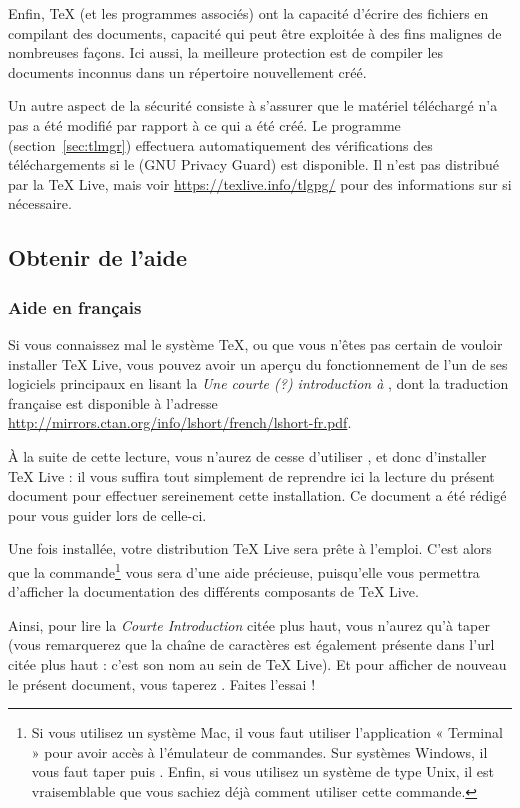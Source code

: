\documentclass[german, english, french]{article}
\renewcommand{\TL}{\TeX{} Live\xspace}%
\begin{document}
Enfin, \TeX{} (et les programmes associés) ont la capacité d'écrire des fichiers
en compilant des documents, capacité qui peut être exploitée à des fins malignes
de nombreuses façons. Ici aussi, la meilleure protection est de compiler les
documents inconnus dans un répertoire nouvellement créé.

Un autre aspect de la sécurité consiste à s'assurer que le matériel téléchargé
n'a pas a été modifié par rapport à ce qui a été créé. Le programme 
(section~\ref{sec:tlmgr}) effectuera automatiquement des vérifications des
téléchargements si le  (GNU Privacy Guard) est disponible. Il n'est
pas distribué par la \TL, mais voir \url{https://texlive.info/tlgpg/} pour des
informations sur  si nécessaire.

\subsection{Obtenir de l'aide}
\label{sec:help}
\subsubsection{Aide en français}
Si vous connaissez mal le système \TeX{}, ou que vous n'êtes pas certain de
vouloir installer \TL{}, vous pouvez avoir un aperçu du fonctionnement de l'un
de ses logiciels principaux en lisant la \emph{Une courte (\string?)
  introduction à \LaTeXe{}}, dont la traduction française est disponible
à l'adresse \url{http://mirrors.ctan.org/info/lshort/french/lshort-fr.pdf}.

À la suite de cette lecture, vous n'aurez de cesse d'utiliser \LaTeXe{}, et donc
d'installer \TL{} : il vous suffira tout simplement de reprendre ici la lecture
du présent document pour effectuer sereinement cette installation.  Ce document
a été rédigé pour vous guider lors de celle-ci.

Une fois installée, votre distribution \TL{} sera prête à l'emploi.  C'est alors
que la commande\footnote{Si vous utilisez un système Mac, il vous faut utiliser
  l'application « Terminal » pour avoir accès à l'émulateur de commandes.  Sur
  systèmes Windows, il vous faut taper  puis .  Enfin, si
  vous utilisez un système de type Unix, il est vraisemblable que vous sachiez
  déjà comment utiliser cette commande.}  vous sera d'une aide
précieuse, puisqu'elle vous permettra d'afficher la documentation des différents
composants de \TL{}.

Ainsi, pour lire la \emph{Courte Introduction} citée plus haut, vous n'aurez
qu'à taper  (vous remarquerez que la chaîne de caractères
 est également présente dans l'url citée plus haut : c'est son
nom au sein de \TL{}).  Et pour afficher de nouveau le présent document, vous
taperez . Faites l'essai !
\end{document}
